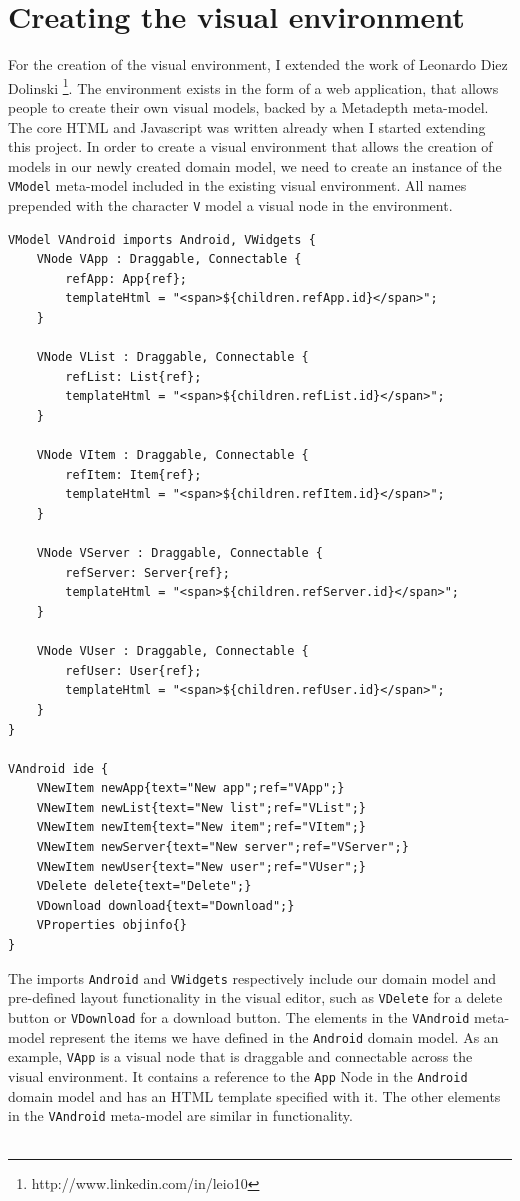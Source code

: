 \section{Creating the visual environment}

For the creation of the visual environment, I extended the work of Leonardo Diez Dolinski \footnote{http://www.linkedin.com/in/leio10}. The environment exists in the form of a web application, that allows people to create their own visual models, backed by a Metadepth meta-model. The core HTML and Javascript was written already when I started extending this project. In order to create a visual environment that allows the creation of models in our newly created domain model, we need to create an instance of the \texttt{VModel} meta-model included in the existing visual environment. All names prepended with the character \texttt{V} model a visual node in the environment. 
\begin{lstlisting}[label=visual-mm,caption=Domain meta-model, captionpos=t]
VModel VAndroid imports Android, VWidgets {
	VNode VApp : Draggable, Connectable {
        refApp: App{ref};
        templateHtml = "<span>${children.refApp.id}</span>";
    }

    VNode VList : Draggable, Connectable {
    	refList: List{ref};
    	templateHtml = "<span>${children.refList.id}</span>";
    }

	VNode VItem : Draggable, Connectable {
    	refItem: Item{ref};
    	templateHtml = "<span>${children.refItem.id}</span>";
    }

    VNode VServer : Draggable, Connectable {
        refServer: Server{ref};
        templateHtml = "<span>${children.refServer.id}</span>";
    }

    VNode VUser : Draggable, Connectable {
    	refUser: User{ref};
    	templateHtml = "<span>${children.refUser.id}</span>";
    }
}

VAndroid ide {
	VNewItem newApp{text="New app";ref="VApp";}
    VNewItem newList{text="New list";ref="VList";}
    VNewItem newItem{text="New item";ref="VItem";}
    VNewItem newServer{text="New server";ref="VServer";}
    VNewItem newUser{text="New user";ref="VUser";}
    VDelete delete{text="Delete";}
    VDownload download{text="Download";}
    VProperties objinfo{}
}
\end{lstlisting}
The imports \texttt{Android} and \texttt{VWidgets} respectively include our domain model and pre-defined layout functionality in the visual editor, such as \texttt{VDelete} for a delete button or \texttt{VDownload} for a download button. The elements in the \texttt{VAndroid} meta-model represent the items we have defined in the \texttt{Android} domain model. As an example, \texttt{VApp} is a visual node that is draggable and connectable across the visual environment. It contains a reference to the \texttt{App} Node in the \texttt{Android} domain model and has an HTML template specified with it. The other elements in the \texttt{VAndroid} meta-model are similar in functionality. \\ \\
